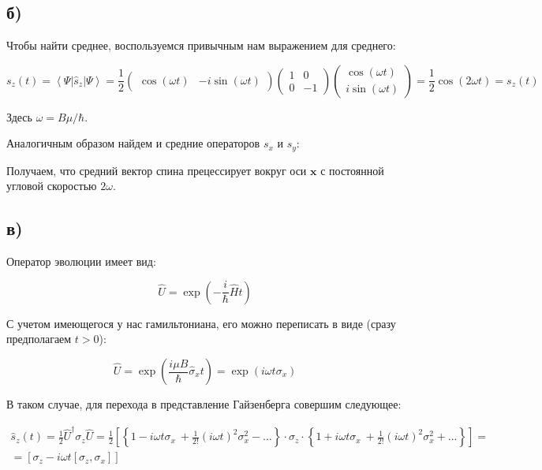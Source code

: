 \documentclass[a4paper, 12pt]{article}
\newcommand*\widefbox[1]{\fbox{\hspace{2em}#1\hspace{2em}}}
\newcommand{\bra}[1]
{\ensuremath{\left\langle#1\right|}}
\newcommand{\cat}[1]
{\ensuremath{\left|#1\right\rangle}}
\begin{document}
\subsection*{б)}

Чтобы найти среднее, воспользуемся привычным нам выражением для среднего:

\begin{equation*}
	s_z(t) = \bra{\Psi}\hat{s}_z\cat{\Psi} = \frac{1}{2} 
	\begin{pmatrix}
		\cos \left(\omega t\right) & -i \sin\left(\omega t\right)
	\end{pmatrix}
	\begin{pmatrix}
		1 & 0\\
		0 & -1
	\end{pmatrix}
	\begin{pmatrix}
		\cos \left(\omega t\right)\\
		i \sin\left(\omega t\right)
	\end{pmatrix}
	= \boxed{\frac{1}{2} \cos\left(2\omega t\right) = s_z(t)}
\end{equation*}

Здесь $\omega = B \mu/\hbar$.

Аналогичным образом найдем и средние операторов $s_x$ и $s_y$:


Получаем, что средний вектор спина прецессирует вокруг оси $\mathbf{x}$ с постоянной угловой скоростью $2\omega$.

\subsection*{в)}

Оператор эволюции имеет вид:

\begin{equation*}
	\hat{U} = \exp\left(-\frac{i}{\hbar}\hat{H} t\right)
\end{equation*}

С учетом имеющегося у нас гамильтониана, его можно переписать в виде (сразу предполагаем $t > 0$):

\begin{equation*}
	\hat{U} = \exp\left(\frac{i \mu B}{\hbar} \hat{\sigma}_x t\right) = \exp\left(i \omega t \sigma_x \right)
\end{equation*}

В таком случае, для перехода в представление Гайзенберга совершим следующее:

\begin{align*}
	\hat{s}_z(t) = \frac{1}{2} \hat{U}^\dagger \sigma_z \hat{U} = \frac{1}{2} \left[\left\{1 - i\omega t \sigma_x\ + \frac{1}{2!}(i \omega t)^2 \sigma_x^2 - ...\right\} \cdot \sigma_z \cdot \left\{1 + i\omega t \sigma_x\ + \frac{1}{2!}(i \omega t)^2 \sigma_x^2 + ...\right\} \right] = \\
	= \left[\sigma_z - i\omega t [\sigma_z,\sigma_x]\right]
\end{align*} 
\end{document}
